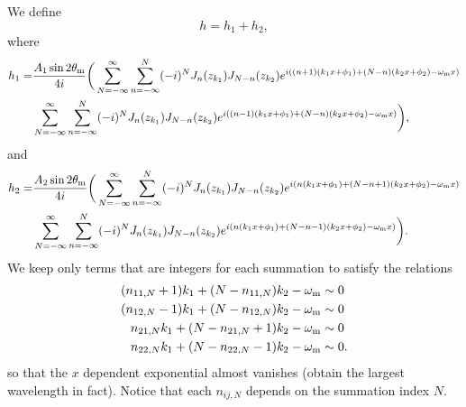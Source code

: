 We define
\begin{equation}
   h = h_1 + h_2,
\end{equation}
where
\begin{align}
   h_1 =& \frac{A_1\sin 2\theta_\mathrm m}{4i}\bigg( \sum_{N=-\infty}^\infty \sum_{n=-\infty}^N (-i)^N J_n(z_{k_1}) J_{N-n}(z_{k_2}) e^{ i  \left(  (n+1) (k_1 x + \phi_1) +  (N-n)(k_2 x + \phi_2) - \omega_\mathrm m x \right) } \nonumber \\
   & \sum_{N=-\infty}^\infty \sum_{n=-\infty}^N (-i)^N J_n(z_{k_1}) J_{N-n}(z_{k_2}) e^{ i \left(  (n-1) (k_1 x + \phi_1) + (N-n)(k_2 x + \phi_2) -  \omega_\mathrm m x \right) }  \bigg),
\end{align}
and
\begin{align}
   h_2=& \frac{A_2\sin 2\theta_\mathrm m}{4i}\bigg( \sum_{N=-\infty}^\infty \sum_{n=-\infty}^N (-i)^N J_n(z_{k_1}) J_{N-n}(z_{k_2}) e^{ i  \left(  n (k_1 x + \phi_1) + (N-n+1)(k_2 x + \phi_2) -  \omega_\mathrm m x \right) } \nonumber\\
   & \sum_{N=-\infty}^\infty \sum_{n=-\infty}^N (-i)^N J_n(z_{k_1}) J_{N-n}(z_{k_2}) e^{ i  \left(  n (k_1 x + \phi_1) + (N-n-1)(k_2 x + \phi_2) -  \omega_\mathrm m x \right) }  \bigg).
\end{align}
We keep only terms that are integers for each summation to satisfy the relations
\begin{align}
   (n_{11,N} + 1)k_1 + (N-n_{11,N}) k_2 -\omega_\mathrm m &\sim 0 \\
   (n_{12,N} - 1)k_1 + (N-n_{12,N}) k_2 -\omega_\mathrm m &\sim 0 \\
   n_{21,N}k_1 + (N-n_{21,N}+1) k_2 -\omega_\mathrm m &\sim 0 \\
   n_{22,N} k_1 + (N-n_{22,N}-1) k_2 -\omega_\mathrm m &\sim 0.
\end{align}
so that the $x$ dependent exponential almost vanishes (obtain the largest wavelength in fact). Notice that each $n_{ij,N}$ depends on the summation index $N$.

